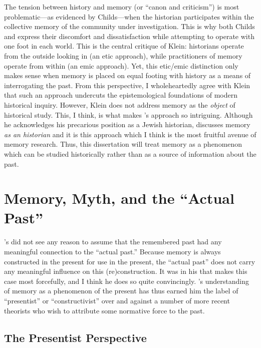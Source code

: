 The tension between history and memory (or ``canon and criticism'') is
most problematic---as evidenced by Childs---when the historian
participates within the collective memory of the community under
investigation. This is why both Childs and \yerushalmi
express their discomfort and dissatisfaction while attempting to operate
with one foot in each world. This is the central critique of Klein:
historians operate from the outside looking in (an etic approach), while
practitioners of memory operate from within (an emic approach). Yet,
this etic/emic distinction only makes sense when memory is placed on
equal footing with history as a means of interrogating the past. From
this perspective, I wholeheartedly agree with Klein that such an
approach undercuts the epistemological foundations of modern historical
inquiry. However, Klein does not address memory as the \emph{object} of
historical study. This, I think, is what makes
\yerushalmi's approach so intriguing. Although he
acknowledges his precarious position as a Jewish historian,
\yerushalmi discusses memory \emph{as an historian} and
it is this approach which I think is the most fruitful avenue of memory
research. Thus, this dissertation will treat memory as a phenomenon
which can be studied historically rather than as a source of information
about the past.

\hypertarget{memory-myth-and-the-actual-past}{%
\section{Memory, Myth, and the ``Actual
Past''}\label{memory-myth-and-the-actual-past}}

\halbwachs's did not see any reason to assume that the
remembered past had any meaningful connection to the ``actual past.''
Because memory is always constructed in the present for use in the
present, the ``actual past'' does not carry any meaningful influence on
this (re)construction. It was in his
 that \halbwachs
makes this case most forcefully, and I think he does so quite
convincingly. \halbwachs's understanding of memory as a
phenomenon of the present has thus earned him the label of
``presentist'' or ``constructivist'' over and against a number of more
recent theorists who wish to attribute some normative force to the
past.\autocite[27--30]{coser_halbwachs1992}

\hypertarget{the-presentist-perspective}{%
\subsection{The Presentist
Perspective}\label{the-presentist-perspective}}

